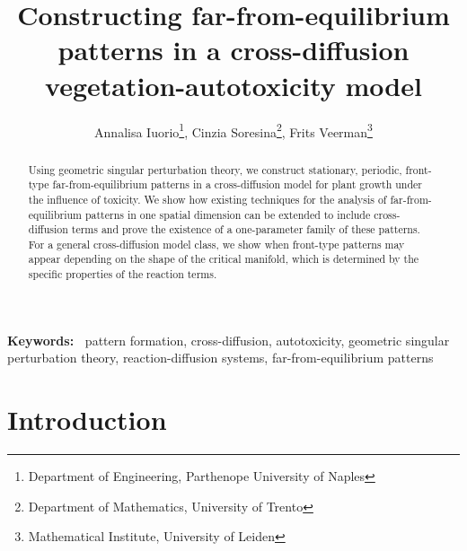 \documentclass[a4paper,10pt,abstract=true,parskip=true]{scrartcl}
\title{Constructing far-from-equilibrium patterns in a cross-diffusion vegetation-autotoxicity model}
\author{Annalisa Iuorio\thanks{Department of Engineering, Parthenope University of Naples}, Cinzia Soresina\thanks{Department of Mathematics, University of Trento}, Frits Veerman\thanks{Mathematical Institute, University of Leiden}}
\date{}
\theoremstyle{remark}
\numberwithin{equation}{section}
\numberwithin{thm}{section}
\providecommand{\keywords}[1]{\flushleft\textbf{Keywords:~} #1}
\begin{document}
\maketitle

\begin{abstract} 
\noindent 
Using geometric singular perturbation theory, we construct stationary, periodic, front-type far-from-equilibrium patterns in a cross-diffusion model for plant growth under the influence of toxicity. We show how existing techniques for the analysis of far-from-equilibrium patterns in one spatial dimension can be extended to include cross-diffusion terms and prove the existence of a one-parameter family of these patterns. For a general cross-diffusion model class, we show when front-type patterns may appear depending on the shape of the critical manifold, which is determined by the specific properties of the reaction terms.
\end{abstract}

\keywords{pattern formation, cross-diffusion, autotoxicity, geometric singular perturbation theory, reaction-diffusion systems, far-from-equilibrium patterns}

\justify


\section{Introduction}\label{sec:intro}
    
\end{document}
